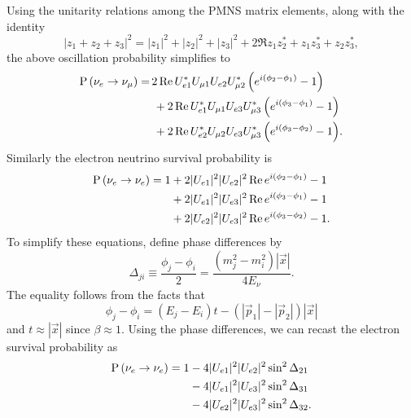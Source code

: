 Using the unitarity relations among the PMNS matrix elements, along with the
identity
\begin{equation}
  |z_1+z_2+z_3|^2=|z_1|^2+|z_2|^2+|z_3|^2
                  +2\Re{z_1z_2^*+z_1z_3^*+z_2z_3^*},
\end{equation}
the above oscillation probability simplifies to
\begin{equation}
  \begin{aligned}
    \operatorname{P}\left(\nu_e\to\nu_\mu\right)=&
    \,2\mathop{\mathrm{Re}}{U_{e1}^*U_{\mu 1}U_{e2}U_{\mu 2}^*\left(e^{i(\phi_2-\phi_1)}-1\right)}
     \\&~+
    2\mathop{\mathrm{Re}}{U_{e1}^*U_{\mu 1}U_{e3}U_{\mu 3}^*\left(e^{i(\phi_3-\phi_1)}-1\right)}
     \\&~+
    2\mathop{\mathrm{Re}}{U_{e2}^*U_{\mu 2}U_{e3}U_{\mu 3}^*\left(e^{i(\phi_3-\phi_2)}-1\right)}
     .
  \end{aligned}
\end{equation}
Similarly the electron neutrino survival probability is
\begin{equation}
  \begin{aligned}
    \operatorname{P}\left(\nu_e\to\nu_e\right)=1&+2|U_{e1}|^2|U_{e2}|^2\mathop{\mathrm{Re}}{e^{i(\phi_2-\phi_1)}-1} \\
                        &+2|U_{e1}|^2|U_{e3}|^2\mathop{\mathrm{Re}}{e^{i(\phi_3-\phi_1)}-1} \\
                        &+2|U_{e2}|^2|U_{e3}|^2\mathop{\mathrm{Re}}{e^{i(\phi_3-\phi_2)}-1}.
  \end{aligned}
\end{equation}
To simplify these equations, define phase differences by
\begin{equation}
  \label{eq:phase}
  \Delta_{ji}\equiv\frac{\phi_j-\phi_i}{2}
                  =\frac{(m_j^2-m_i^2)|\vec{x}|}{4E_\nu}.
\end{equation}
The equality follows from the facts that
\begin{equation}
  \phi_j-\phi_i=(E_j-E_i)t-(|\vec{p}_1|-|\vec{p}_2|)|\vec{x}|
\end{equation}
and $t\approx|\vec{x}|$ since $\beta\approx1$.
Using the phase differences, we can recast the electron survival probability as
\begin{equation}
  \label{eq:esurv}
  \begin{aligned}
    \operatorname{P}\left(\nu_e\to\nu_e\right)=1&-4|U_{e1}|^2|U_{e2}|^2\sin^2\Delta_{21} \\
                        &-4|U_{e1}|^2|U_{e3}|^2\sin^2\Delta_{31} \\
                        &-4|U_{e2}|^2|U_{e3}|^2\sin^2\Delta_{32}.
  \end{aligned}
\end{equation}
